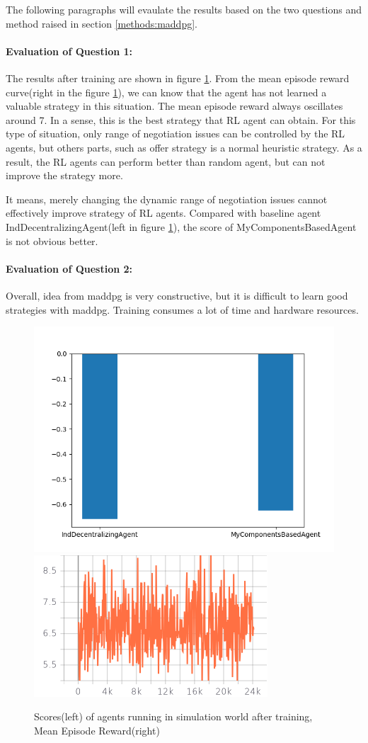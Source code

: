 The following paragraphs will evaulate the results based on the two questions and method raised in section \ref{methods:maddpg}. 

\paragraph{Evaluation of Question 1:} The results after training are shown in figure \ref{fig:dynamical-range-issues-maddpg}. From the mean episode reward curve(right in the figure \ref{fig:dynamical-range-issues-maddpg}), we can know that the agent has not learned a valuable strategy in this situation. The mean episode reward always oscillates around 7. In a sense, this is the best strategy that RL agent can obtain. For this type of situation,  only range of negotiation issues can be controlled by the RL agents, but others parts, such as offer strategy is a normal heuristic strategy. As a result, the RL agents can perform better than random agent, but can not improve the strategy more.

It means, merely changing the dynamic range of negotiation issues cannot effectively improve strategy of RL agents. Compared with baseline agent IndDecentralizingAgent(left in figure \ref{fig:dynamical-range-issues-maddpg}), the score of MyComponentsBasedAgent is not obvious better.  

\paragraph{Evaluation of Question 2:}  
 
Overall, idea from maddpg is very constructive, but it is difficult to learn good strategies with maddpg. Training consumes a lot of time and hardware resources.


\begin{figure}
    \includegraphics[width=.45\textwidth]{./images/dynamic_range_issues_maddpg.png}\hfill
    \includegraphics[width=.49\textwidth]{./images/dynamical_mean_episode_reward.png}
    \caption{Scores(left) of agents running in simulation world after training, Mean Episode Reward(right)}
		\label{fig:dynamical-range-issues-maddpg}
\end{figure}

